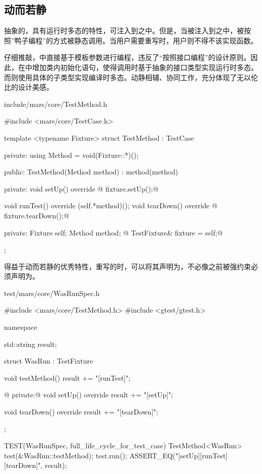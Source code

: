 \begin{content}
\subsection{动而若静}

抽象的，具有运行时多态的特性，可注入到之中。但是，当被注入到之中，被按照''鸭子编程''的方式被静态调用。当用户需要重写时，用户则不得不该实现函数。

仔细推敲，中直接基于模板参数进行编程，违反了“按照接口编程”的设计原则。因此，在中增加类内初始化语句，使得调用时基于抽象的接口类型实现运行时多态。而则使用具体的子类型实现编译时多态。动静相辅、协同工作，充分体现了无以伦比的设计美感。

\begin{nodiff}{include/mars/core/TestMethod.h}
 \begin{c++}
#include <mars/core/TestCase.h>

template <typename Fixture>
struct TestMethod : TestCase {
private:
  using Method = void(Fixture::*)();

public:
  TestMethod(Method method)
    : method(method) {}

private:
  void setUp() override {
@    fixture.setUp();@
  }

  void runTest() override {
    (self.*method)();
  }
  void tearDown() override {
@    fixture.tearDown();@
  }

private:
  Fixture self;
  Method method;
@  TestFixture& fixture = self;@
};
  \end{c++}
\end{nodiff}

得益于动而若静的优秀特性，重写的时，可以将其声明为，不必像之前被强约束必须声明为。

\begin{nodiff}{test/mars/core/WasRunSpec.h}
 \begin{c++}
#include <mars/core/TestMethod.h>
#include <gtest/gtest.h>

namespace {
  std::string result;

  struct WasRun : TestFixture {
    void testMethod() {
      result += "[runTest]";
    }

@  private:@
    void setUp() override {
      result += "[setUp]";
    }

    void tearDown() override {
      result += "[tearDown]";
    }
  };
}

TEST(WasRunSpec, full_life_cycle_for_test_case) {
  TestMethod<WasRun> test(&WasRun::testMethod);
  test.run();
  ASSERT_EQ("[setUp][runTest][tearDown]", result);
}
  \end{c++}
\end{nodiff}

\end{content}

